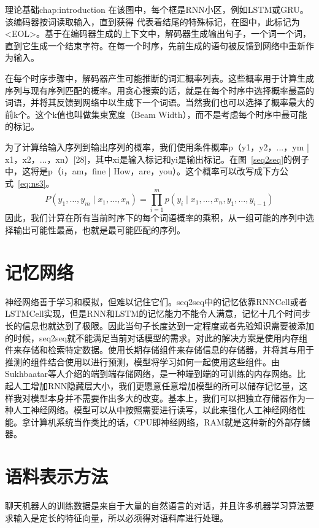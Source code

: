 \begin{cuzchapter}{理论基础}{chap:introduction}
在该图中，每个框是RNN小区，例如LSTM或GRU。该编码器按词读取输入，直到获得
代表着结尾的特殊标记，在图中，此标记为<EOL>。基于在编码器生成的上下文中，解码器生成输出句子，一个词一个词，直到它生成一个结束字符。在每一个时序，先前生成的语句被反馈到网络中重新作为输入。

在每个时序步骤中，解码器产生可能推断的词汇概率列表。这些概率用于计算生成序列与现有序列匹配的概率。用贪心搜索的话，就是在每个时序中选择概率最高的词语，并将其反馈到网络中以生成下一个词语\cite{Sutskever2014Sequence}。当然我们也可以选择了概率最大的前k个。这个k值也叫做集束宽度（Beam Width），而不是考虑每个时序中最可能的标记。

为了计算给输入序列到输出序列的概率，我们使用条件概率p（y1，y2，...，ym | x1，x2，...，xn）[28]，其中xi是输入标记和yi是输出标记。在图~\ref{seq2seq}的例子中，这将是p（i，am，fine | How，are，you）。这个概率可以改写成下方公式~\ref{eq:ns3}。
\begin{equation}
    \label{eq:ns3}
    P( y_{1},\ldots ,y_{m}\mid x_{1},\ldots ,x_{n}) = \prod ^{m}_{i=1}p( y_{i}\mid x_{1},\ldots ,x_{n},y_{1},\ldots ,y_{i-1} )   
\end{equation}
因此，我们计算在所有当前时序下的每个词语概率的乘积，从一组可能的序列中选择输出可能性最高，也就是最可能匹配的序列。
\section{记忆网络}\label{sec:background}
神经网络善于学习和模拟，但难以记住它们。seq2seq中的记忆依靠RNNCell或者LSTMCell实现，但是RNN和LSTM的记忆能力不能令人满意，记忆十几个时间步长的信息也就达到了极限。因此当句子长度达到一定程度或者先验知识需要被添加的时候，seq2seq就不能满足当前对话模型的需求。对此的解决方案是使用内存组件来存储和检索特定数据。使用长期存储组件来存储信息的存储器，并将其与用于推测的组件结合使用以进行预测，模型将学习如何一起使用这些组件。由Sukhbaatar等人介绍的端到端存储网络\cite{Perez2016Gated}，是一种端到端的可训练的内存网络。比起人工增加RNN隐藏层大小，我们更愿意任意增加模型的所可以储存记忆量，这样我对模型本身并不需要作出多大的改变。基本上，我们可以把独立存储器作为一种人工神经网络。模型可以从中按照需要进行读写，以此来强化人工神经网络性能。拿计算机系统当作类比的话，CPU即神经网络，RAM就是这种新的外部存储器。
\section{语料表示方法}\label{sec:background}
聊天机器人的训练数据是来自于大量的自然语言的对话，并且许多机器学习算法要求输入是定长的特征向量\cite{Le2014Distributed}，所以必须得对语料库进行处理。


\end{cuzchapter}
